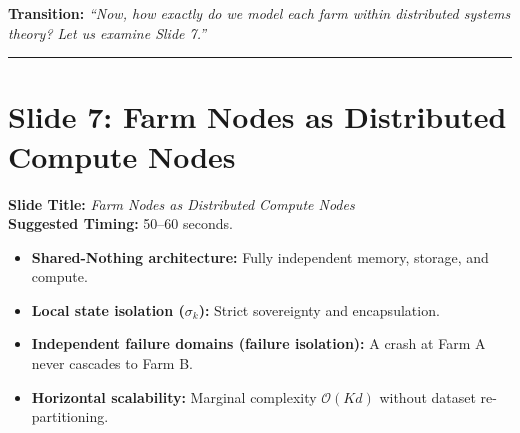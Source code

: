\documentclass[11pt,a4paper]{article}
\begin{document}
\textbf{Transition:} \textit{``Now, how exactly do we model each farm within distributed systems theory? Let us examine Slide 7.''}

\vspace{0.35cm}\hrule\vspace{0.35cm}

\section{Slide 7: Farm Nodes as Distributed Compute Nodes}
\textbf{Slide Title:} \textit{Farm Nodes as Distributed Compute Nodes} \\
\textbf{Suggested Timing:} 50--60 seconds.

\begin{tcolorbox}[colframe=primaryblue, title=\textbf{Key Distributed Systems Points to Emphasize}]
\begin{itemize}[leftmargin=*]
    \item \textbf{Shared-Nothing architecture:} Fully independent memory, storage, and compute.
    \item \textbf{Local state isolation ($\sigma_k$):} Strict sovereignty and encapsulation.
    \item \textbf{Independent failure domains (failure isolation):} A crash at Farm A never cascades to Farm B.
    \item \textbf{Horizontal scalability:} Marginal complexity $\mathcal{O}(Kd)$ without dataset re-partitioning.
\end{itemize}
\end{tcolorbox}
\end{document}
